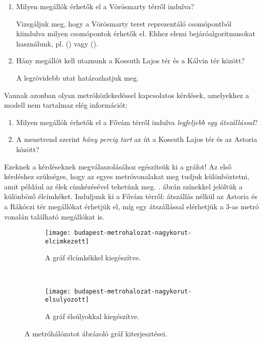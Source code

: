 	\begin{enumerate}
		\item Milyen megállók érhetők el a Vörösmarty térről indulva?
		
			Vizsgáljuk meg, hogy a Vörösmarty teret reprezentáló csomópontból kiindulva milyen csomópontok érhetők el. Ehhez elemi bejáróalgoritmusokat használunk, pl.  () vagy  ().
		\item Hány megállót kell utaznunk a Kossuth Lajos tér és a Kálvin tér között?

			A legrövidebb utat  határozhatjuk meg.
	\end{enumerate}

	Vannak azonban olyan metróközlekedéssel kapcsolatos kérdések, amelyekhez a modell nem tartalmaz elég információt:
	
	\begin{enumerate}
		\item Milyen megállók érhetők el a Fővám térről indulva \emph{legfeljebb egy átszállással}?
		\item A menetrend szerint \emph{hány percig tart} az út a Kossuth Lajos tér és az Astoria között?
	\end{enumerate}

	Ezeknek a kérdéseknek megválaszolásához egészítsük ki a gráfot! Az első kérdéshez szükséges, hogy az egyes metróvonalakat meg tudjuk különböztetni, amit például az élek címkézésével tehetünk meg. . ábrán színekkel jelöltük a különböző élcímkéket. Induljunk ki a Fővám térről: átszállás nélkül az Astoria és a Rákóczi tér megállókat érhetjük el, míg egy átszállással elérhetjük a 3-as metró vonalán található megállókat is.

	\begin{figure}[H]
		\begin{subfigure}[b]{0.5\textwidth}
			\texttt{[image: budapest-metrohalozat-nagykorut-elcimkezett]}
			\caption{A gráf élcímkékkel kiegészítve.}
			\label{fig:budapest-metrohalozat-nagykorut-elcimkezett}
		\end{subfigure}
		~ %
		\begin{subfigure}[b]{0.5\textwidth}
			\texttt{[image: budapest-metrohalozat-nagykorut-elsulyozott]}
			\caption{A gráf élsúlyokkal kiegészítve.}
			\label{fig:budapest-metrohalozat-nagykorut-elsulyozott}
		\end{subfigure}
		\caption{A metróhálózatot ábrázoló gráf kiterjesztései.}\label{fig:animals}
	\end{figure}
	
